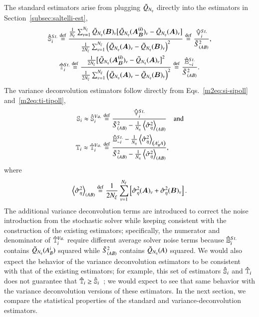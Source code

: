 The standard estimators arise from plugging $\tilde{Q}_{{N_\eta}}$ directly into the estimators in Section~\ref{subsec:saltelli-est},
\begin{gather} \label{m2eq:saltelli-si-poll}
    \hat{\mathbb{S}}_{i}^{St.} \overset{\operatorname{def}}{=} \frac{\frac{1}{{N_\xi}} \sum_{v=1}^{{N_\xi}} \tilde{Q}_{{N_\eta}}(\bm{B})_v \bigl[ \tilde{Q}_{{N_\eta}}(\bm{A_B^{(i)}})_v - \tilde{Q}_{{N_\eta}}(\bm{A})_v \bigr]}{\frac{1}{2{N_\xi}} \sum_{v=1}^{{N_\xi}} \left( \tilde{Q}_{{N_\eta}}(\bm{A})_v - \tilde{Q}_{{N_\eta}}(\bm{B})_v \right)^2} \overset{\operatorname{def}}{=} \frac{\hat{\mathbb{V}}_{i}^{St.}}{\tilde{S}^2_{\left( AB \right)}}, \\ \label{m2eq:saltelli-ti-poll}
    \hat{\mathbb{T}}_{i}^{St.} \overset{\operatorname{def}}{=} \frac{ \frac{1}{2{N_\xi}} \bigl[ \tilde{Q}_{{N_\eta}}(\bm{A_B^{(i)}})_v - \tilde{Q}_{{N_\eta}}(\bm{A})_v \bigr]^2}{\frac{1}{2{N_\xi}} \sum_{v=1}^{{N_\xi}} \left( \tilde{Q}_{{N_\eta}}(\bm{A})_v - \tilde{Q}_{{N_\eta}}(\bm{B})_v \right)^2} \overset{\operatorname{def}}{=} \frac{\hat{\mathbb{E}}_{{\sim i}}^{St.}}{\tilde{S}^2_{\left( AB \right)}}.
\end{gather}
The variance deconvolution estimators follow directly from Eqs.~\eqref{m2eq:si-sipoll} and~\eqref{m2eq:ti-tipoll},
\begin{align}
    \mathbb{S}_{i} \approx \hat{\mathbb{S}}_{i}^{Va.} &\overset{\operatorname{def}}{=} \frac{\hat{\mathbb{V}}_{i}^{St.}}{\tilde{S}^2_{\left( AB \right)} - \frac{1}{{N_\eta}}\left< \hat{\sigma}^2_\eta \right>_{\left(AB \right)}} \quad \text{and} \\
    \mathbb{T}_{i} \approx \hat{\mathbb{T}}_{i}^{Va.} &\overset{\operatorname{def}}{=} \frac{\hat{\mathbb{E}}_{{\sim i}}^{St.} -{\frac{1}{{N_\eta}} \left< \hat{\sigma}^2_\eta \right>_{\left(A_B^i A \right)}}}{\tilde{S}^2_{\left( AB \right)} - \frac{1}{{N_\eta}} \left< \hat{\sigma}^2_\eta \right>_{\left(AB \right)}} ,
\end{align}
where 
\begin{equation}
    \left< \hat{\sigma}^2_\eta \right>_{\left(AB \right)} \overset{\operatorname{def}}{=} \frac{1}{2{N_\xi}} \sum_{v=1}^{{N_\xi}} \left[ \hat{\sigma}^2_\eta(\bm{A})_v + \hat{\sigma}^2_\eta(\bm{B})_v \right].
\end{equation}
The additional variance deconvolution terms are introduced to correct the noise introduction from the stochastic solver while keeping consistent with the construction of the existing estimators; specifically, the numerator and denominator of $\hat{\mathbb{T}}_{i}^{Va.}$ require different average solver noise terms because $\hat{\mathbb{E}}_{i}^{St.}$ contains $\tilde{Q}_{{N_\eta}}(A_B^i)$ squared while $\tilde{S}^2_{\left( AB \right)}$ contains $\tilde{Q}_{{N_\eta}}(A)$ squared.
We would also expect the behavior of the variance deconvolution estimators to be consistent with that of the existing estimators; for example, this set of estimators $\hat{\mathbb{S}}_{i}$ and $\hat{\mathbb{T}}_{i}$ does not guarantee that $\hat{\mathbb{T}}_{i} \geq \hat{\mathbb{S}}_{i}$~\cite{azzini-etal-2021}; we would expect to see that same behavior with the variance deconvolution versions of these estimators.
In the next section, we compare the statistical properties of the standard and variance-deconvolution estimators.

